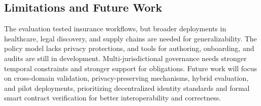 \documentclass[pdflatex,sn-mathphys-num]{sn-jnl}
\begin{document}
\subsection{Limitations and Future Work}
The evaluation tested insurance workflows, but broader deployments in healthcare, legal discovery, and supply chains are needed for generalizability. The policy model lacks privacy protections, and tools for authoring, onboarding, and audits are still in development. Multi-jurisdictional governance needs stronger temporal constraints and stronger support for obligations. Future work will focus on cross-domain validation, privacy-preserving mechanisms, hybrid evaluation, and pilot deployments, prioritizing decentralized identity standards and formal smart contract verification for better interoperability and correctness.
\end{document}

